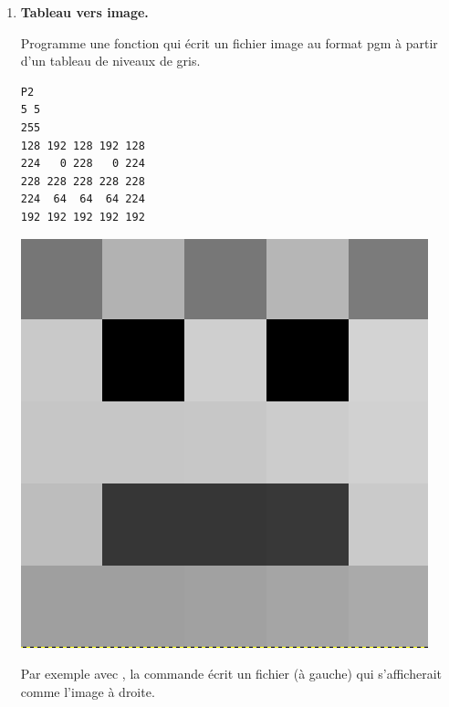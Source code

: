 \documentclass[11pt,class=report,crop=false]{standalone}
\begin{document}
\begin{activite}



\begin{enumerate}
  \item \textbf{Tableau vers image.}
  
  Programme une fonction  qui écrit un fichier image au format \og{}pgm\fg{} à partir d'un tableau de niveaux de gris.
  
\begin{center}
\begin{minipage}{0.3\textwidth}
\begin{lstlisting}
P2
5 5
255
128 192 128 192 128
224   0 228   0 224
228 228 228 228 228 
224  64  64  64 224 
192 192 192 192 192 
\end{lstlisting}
\end{minipage}
\begin{minipage}{0.3\textwidth}
\begin{center}
\includegraphics[scale=\myscale,scale=0.15]{input/ecran-test-pgm}
\end{center}
\end{minipage}
\end{center}
Par exemple avec , la commande  écrit un fichier  (à gauche) qui s'afficherait comme l'image à droite.


\end{enumerate}
\end{activite}
\end{document}
